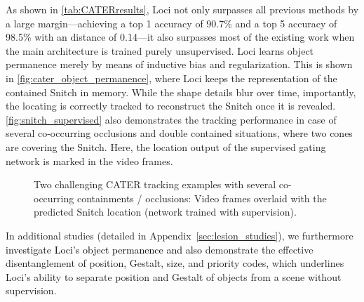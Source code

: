 \documentclass{article} \usepackage{iclr2023_conference_arxiv,times}
\def\imagepadding{0.2cm}
\def\imagepaddingy{0.15cm}
\newcommand{\changed}{\textcolor{black}}
\begin{document}
As shown in \autoref{tab:CATERresults}, Loci not only surpasses all previous methods by a large margin---achieving a top 1 accuracy of 90.7\% and a top 5 accuracy of 98.5\% with an  distance of 0.14---it also surpasses most of the existing work when the main architecture is trained purely unsupervised. 
Loci learns object permanence merely by means of inductive bias and regularization. This is shown in \autoref{fig:cater_object_permanence}, where Loci keeps the representation of the contained Snitch in memory. While the shape details blur over time, importantly, the locating is correctly tracked to reconstruct the Snitch once it is revealed.
\autoref{fig:snitch_supervised} also demonstrates the tracking performance in case of several co-occurring occlusions and double contained situations, where two cones are covering the Snitch. Here, the location output of the supervised gating network is marked in the video frames.

\begin{figure}[t!]
    \begin{elasticrow}[\imagepadding]
    \end{elasticrow}
    \vskip\imagepaddingy
    \begin{elasticrow}[\imagepadding]
    \end{elasticrow}

    
    \caption{Two challenging CATER tracking examples with several co-occurring containments / occlusions: Video frames overlaid with the predicted Snitch location (network trained with supervision).} 
    \label{fig:snitch_supervised}
\end{figure}

In additional studies (detailed in Appendix~\ref{sec:lesion_studies}), we furthermore \changed{investigate Loci's object permanence and also} demonstrate the effective disentanglement of position, Gestalt, size, and priority codes, which underlines Loci's ability to separate position and Gestalt of objects from a scene without supervision.
\end{document}

